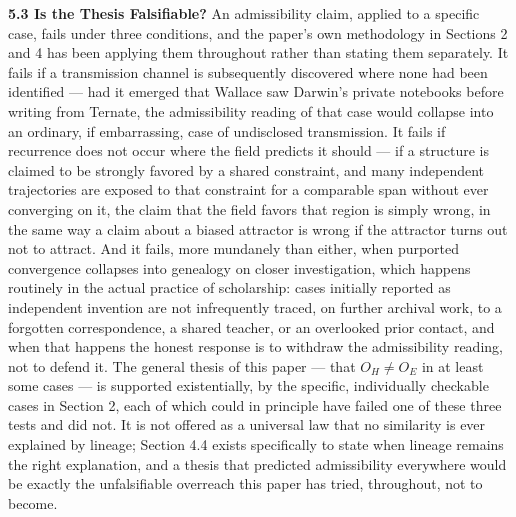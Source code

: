 \documentclass[11pt]{article}
\theoremstyle{plain}
\begin{document}
\textbf{5.3 Is the Thesis Falsifiable?} An admissibility claim, applied to a specific case, fails under three conditions, and the paper's own methodology in Sections 2 and 4 has been applying them throughout rather than stating them separately. It fails if a transmission channel is subsequently discovered where none had been identified --- had it emerged that Wallace saw Darwin's private notebooks before writing from Ternate, the admissibility reading of that case would collapse into an ordinary, if embarrassing, case of undisclosed transmission. It fails if recurrence does not occur where the field predicts it should --- if a structure is claimed to be strongly favored by a shared constraint, and many independent trajectories are exposed to that constraint for a comparable span without ever converging on it, the claim that the field favors that region is simply wrong, in the same way a claim about a biased attractor is wrong if the attractor turns out not to attract. And it fails, more mundanely than either, when purported convergence collapses into genealogy on closer investigation, which happens routinely in the actual practice of scholarship: cases initially reported as independent invention are not infrequently traced, on further archival work, to a forgotten correspondence, a shared teacher, or an overlooked prior contact, and when that happens the honest response is to withdraw the admissibility reading, not to defend it. The general thesis of this paper --- that \(O_H \neq O_E\) in at least some cases --- is supported existentially, by the specific, individually checkable cases in Section 2, each of which could in principle have failed one of these three tests and did not. It is not offered as a universal law that no similarity is ever explained by lineage; Section 4.4 exists specifically to state when lineage remains the right explanation, and a thesis that predicted admissibility everywhere would be exactly the unfalsifiable overreach this paper has tried, throughout, not to become.
\end{document}
